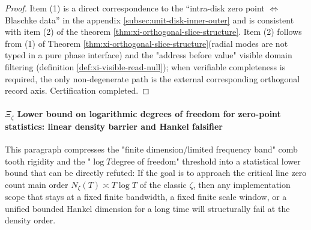 \begin{proof}
Item (1) is a direct correspondence to the “intra-disk zero point \(\Leftrightarrow\) ​​Blaschke data” in the appendix \ref{subsec:unit-disk-inner-outer} and is consistent with item (2) of the theorem \ref{thm:xi-orthogonal-slice-structure}.
Item (2) follows from (1) of Theorem \ref{thm:xi-orthogonal-slice-structure} ​​(radial modes are not typed in a pure phase interface) and the "address before value" visible domain filtering (definition \ref{def:xi-visible-read-null}); when verifiable completeness is required, the only non-degenerate path is the external corresponding orthogonal record axis. Certification completed.
\end{proof}

\paragraph{\texorpdfstring{$\Xi_\zeta$}{Xi-zeta} Lower bound on logarithmic degrees of freedom for zero-point statistics: linear density barrier and Hankel falsifier}
This paragraph compresses the "finite dimension/limited frequency band" comb tooth rigidity and the "\(\log T\) ​​degree of freedom" threshold into a statistical lower bound that can be directly refuted:
If the goal is to approach the critical line zero count main order \(N_\zeta(T)\asymp T\log T\) of the classic \(\zeta\), then any implementation scope that stays at a fixed finite bandwidth, a fixed finite scale window, or a unified bounded Hankel dimension for a long time will structurally fail at the density order.

